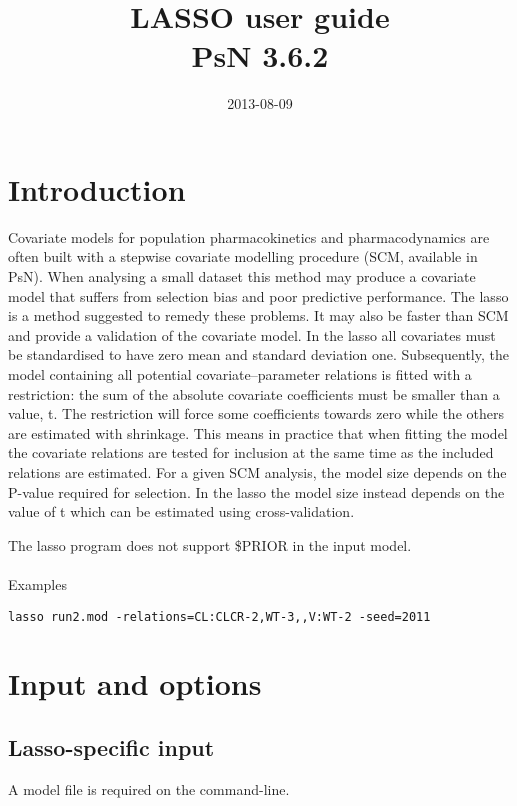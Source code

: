 \documentclass[a4paper,12pt]{article}
\title{LASSO user guide\\ \vspace{2 mm} {\large PsN 3.6.2}}
\date{2013-08-09}
\begin{document}
\maketitle


\section{Introduction}
Covariate models for population pharmacokinetics and pharmacodynamics are often built with a stepwise covariate modelling procedure (SCM, available in PsN). When analysing a small dataset this method may produce a covariate model that suffers from selection bias and poor predictive performance. The lasso \cite{Ribbing} is a method suggested to remedy these problems. It may also be faster than SCM and provide a validation of the covariate model. In the lasso all covariates must be standardised to have zero mean and standard deviation one. Subsequently, the model containing all potential covariate–parameter relations is fitted with a restriction: the sum of the absolute covariate coefficients must be smaller than a value, t. The restriction will force some coefficients towards zero while the others are estimated with shrinkage. This means in practice that when fitting the model the covariate relations are tested for inclusion at the same time as the included relations are estimated. For a given SCM analysis, the model size depends on the P-value required for selection. In the lasso the model size instead depends on the value of t which can be estimated using cross-validation.

The lasso program does not support \$PRIOR in the input model.
\\
\\
Examples
\begin{verbatim}
lasso run2.mod -relations=CL:CLCR-2,WT-3,,V:WT-2 -seed=2011
\end{verbatim}

\section{Input and options}

\subsection{Lasso-specific input}
A model file is required on the command-line.
\end{document}
